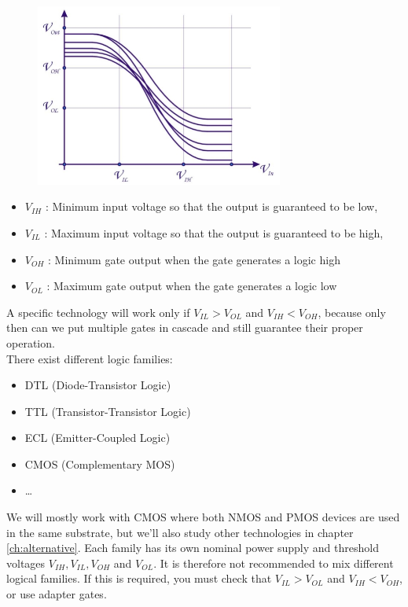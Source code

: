 \begin{figure}[h!]
	\centering
	\includegraphics[height=6cm]{figures/ch13/digital_thresholds.jpg}
	\caption{}
	\label{fig:digital_thresholds}
\end{figure}

\begin{itemize}
	\item $V_{IH}$ : Minimum input voltage so that the output is guaranteed to be low,
	\item $V_{IL}$ : Maximum input voltage so that the output is guaranteed to be high,
	\item $V_{OH}$ : Minimum gate output when the gate generates a logic high
	\item $V_{OL}$ : Maximum gate output when the gate generates a logic low
\end{itemize}

A specific technology will work only if $V_{IL} > V_{OL}$ and $V_{IH} < V_{OH}$, because only then can we put multiple gates in cascade and still guarantee their proper operation.\\
There exist different logic families:
\begin{itemize}
	\item DTL (Diode-Transistor Logic)
	\item TTL (Transistor-Transistor Logic)
	\item ECL (Emitter-Coupled Logic)
	\item CMOS (Complementary MOS)
	\item \ldots
\end{itemize}
We will mostly work with CMOS where both NMOS and PMOS devices are used in the same substrate, but we'll also study other technologies in chapter \ref{ch:alternative}. Each family has its own nominal power supply and threshold voltages $V_{IH}, V_{IL}, V_{OH}$ and $V_{OL}$. It is therefore not recommended to mix different logical families. If this is required, you must check that $V_{IL} > V_{OL}$ and $V_{IH} < V_{OH}$, or use adapter gates.

